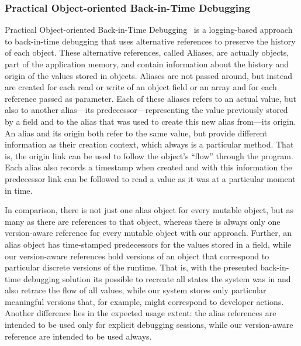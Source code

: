 \subsubsection{Practical Object-oriented Back-in-Time Debugging}

Practical Object-oriented Back-in-Time Debugging~\cite{Lienhard2008POB} is a logging-based approach to back-in-time debugging that uses alternative references to preserve the history of each object.
These alternative references, called Aliases, are actually objects, part of the application memory, and contain information about the history and origin of the values stored in objects.
Aliases are not passed around, but instead are created for each read or write of an object field or an array and for each reference passed as parameter.
Each of these aliases refers to an actual value, but also to another alias---its predecessor---representing the value previously stored by a field and to the alias that was used to create this new alias from---its origin.
An alias and its origin both refer to the same value, but provide different information as their creation context, which always is a particular method.
That is, the origin link can be used to follow the object's ``flow'' through the program.
Each alias also records a timestamp when created and with this information the predecessor link can be followed to read a value as it was at a particular moment in time.

In comparison, there is not just one alias object for every mutable object, but as many as there are references to that object, whereas there is always only one version-aware reference for every mutable object with our approach.
Further, an alias object has time-stamped predecessors for the values stored in a field, while our version-aware references hold versions of an object that correspond to particular discrete versions of the runtime.
That is, with the presented back-in-time debugging solution its possible to recreate all states the system was in and also retrace the flow of all values, while our system stores only particular meaningful versions that, for example, might correspond to developer actions.
Another difference lies in the expected usage extent: the alias references are intended to be used only for explicit debugging sessions, while our version-aware reference are intended to be used always.

